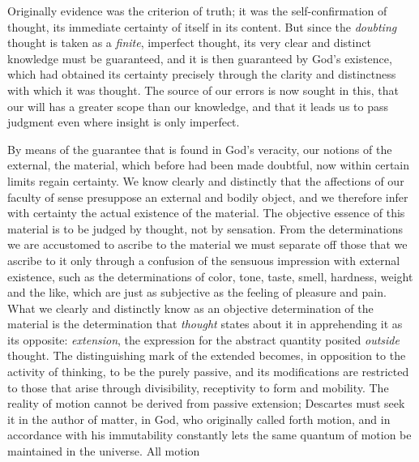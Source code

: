Originally evidence was the criterion of truth; it was the self-confirmation of thought, its immediate certainty of itself in its content. But since the \emph{doubting} thought is taken as a \emph{finite}, imperfect thought, its very clear and distinct knowledge must be guaranteed, and it is then guaranteed by God's existence, which had obtained its certainty precisely through the clarity and distinctness with which it was thought. The source of our errors is now sought in this, that our will has a greater scope than our knowledge, and that it leads us to pass judgment even where insight is only imperfect.

By means of the guarantee that is found in God's veracity, our notions of the external, the material, which before had been made doubtful, now within certain limits regain certainty. We know clearly and distinctly that the affections of our faculty of sense presuppose an external and bodily object, and we therefore infer with certainty the actual existence of the material. The objective essence of this material is to be judged by thought, not by sensation. From the determinations we are accustomed to ascribe to the material we must separate off those that we ascribe to it only through a confusion of the sensuous impression with external existence, such as the determinations of color, tone, taste, smell, hardness, weight and the like, which are just as subjective as the feeling of pleasure and pain. What we clearly and distinctly know as an objective determination of the material is the determination that \emph{thought} states about it in apprehending it as its opposite: \emph{extension}, the expression for the abstract quantity posited \emph{outside} thought. The distinguishing mark of the extended becomes, in opposition to the activity of thinking, to be the purely passive, and its modifications are restricted to those that arise through divisibility, receptivity to form and mobility. The reality of motion cannot be derived from passive extension; Descartes must seek it in the author of matter, in God, who originally called forth motion, and in accordance with his immutability constantly lets the same quantum of motion be maintained in the universe. All motion
